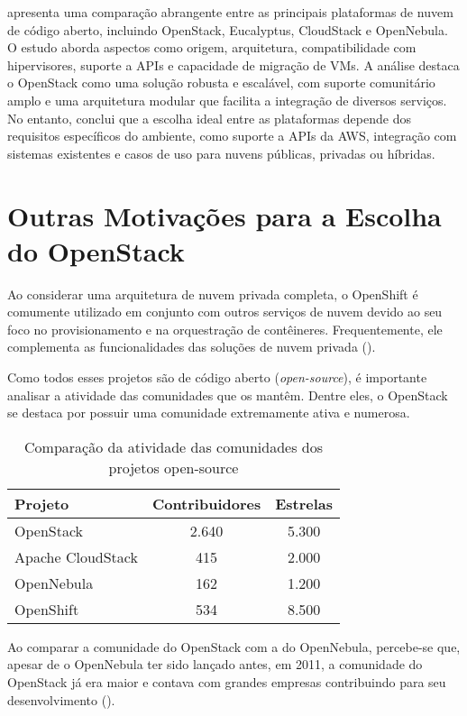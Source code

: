 \cite{kumar2014open} apresenta uma comparação abrangente entre as principais plataformas de nuvem de código aberto, incluindo OpenStack, Eucalyptus, CloudStack e OpenNebula. O estudo aborda aspectos como origem, arquitetura, compatibilidade com hipervisores, suporte a APIs e capacidade de migração de VMs. A análise destaca o OpenStack como uma solução robusta e escalável, com suporte comunitário amplo e uma arquitetura modular que facilita a integração de diversos serviços. No entanto, conclui que a escolha ideal entre as plataformas depende dos requisitos específicos do ambiente, como suporte a APIs da AWS, integração com sistemas existentes e casos de uso para nuvens públicas, privadas ou híbridas.



\section{Outras Motivações para a Escolha do OpenStack}

Ao considerar uma arquitetura de nuvem privada completa, o OpenShift é comumente utilizado em conjunto com outros serviços de nuvem devido ao seu foco no provisionamento e na orquestração de contêineres. Frequentemente, ele complementa as funcionalidades das soluções de nuvem privada (\cite{IBMWithOpenShift}).

Como todos esses projetos são de código aberto (\textit{open-source}), é importante analisar a atividade das comunidades que os mantêm. Dentre eles, o OpenStack se destaca por possuir uma comunidade extremamente ativa e numerosa.

\begin{table}[htbp]
    \centering
    \caption{Comparação da atividade das comunidades dos projetos open-source}
    \label{tab:comunidade_projetos}
    \begin{tabular}{|l|c|c|}
        \hline
        \textbf{Projeto} & \textbf{Contribuidores} & \textbf{Estrelas} \\ \hline
        OpenStack & 2.640 & 5.300 \\ \hline
        Apache CloudStack & 415 & 2.000 \\ \hline
        OpenNebula & 162 & 1.200 \\ \hline
        OpenShift & 534 & 8.500 \\ \hline
    \end{tabular}
\end{table}

Ao comparar a comunidade do OpenStack com a do OpenNebula, percebe-se que, apesar de o OpenNebula ter sido lançado antes, em 2011, a comunidade do OpenStack já era maior e contava com grandes empresas contribuindo para seu desenvolvimento (\cite{wen2012comparison}).

